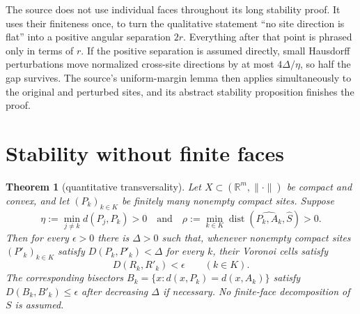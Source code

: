 \documentclass[11pt]{article}
\newtheorem{theorem}{Theorem}
\newcommand{\R}{\mathbb R}
\newcommand{\dist}{\operatorname{dist}}
\begin{document}
The source does not use individual faces throughout its long stability proof.
It uses their finiteness once, to turn the qualitative statement ``no site
direction is flat'' into a positive angular separation $2r$.  Everything
after that point is phrased only in terms of $r$.  If the positive separation
is assumed directly, small Hausdorff perturbations move normalized cross-site
directions by at most $4\Delta/\eta$, so half the gap survives.  The source's
uniform-margin lemma then applies simultaneously to the original and
perturbed sites, and its abstract stability proposition finishes the proof.

\section{Stability without finite faces}

\begin{theorem}[quantitative transversality]\label{thm:quant}
Let $X\subset(\R^m,\|\cdot\|)$ be compact and convex, and let
$(P_k)_{k\in K}$ be finitely many nonempty compact sites.  Suppose
\[
 \eta:=\min_{j\neq k}d(P_j,P_k)>0
 \quad\text{and}\quad
 \rho:=\min_{k\in K}\dist(\widehat{P_k,A_k},\widehat S)>0.
\]
Then for every $\epsilon>0$ there is $\Delta>0$ such that, whenever nonempty
compact sites $(P'_k)_{k\in K}$ satisfy
$D(P_k,P'_k)<\Delta$ for every $k$, their Voronoi cells satisfy
\[
 D(R_k,R'_k)<\epsilon\qquad(k\in K).
\]
The corresponding bisectors
$B_k=\{x:d(x,P_k)=d(x,A_k)\}$ satisfy
$D(B_k,B'_k)\leq\epsilon$ after decreasing $\Delta$ if necessary.
No finite-face decomposition of $S$ is assumed.
\end{theorem}
\end{document}
